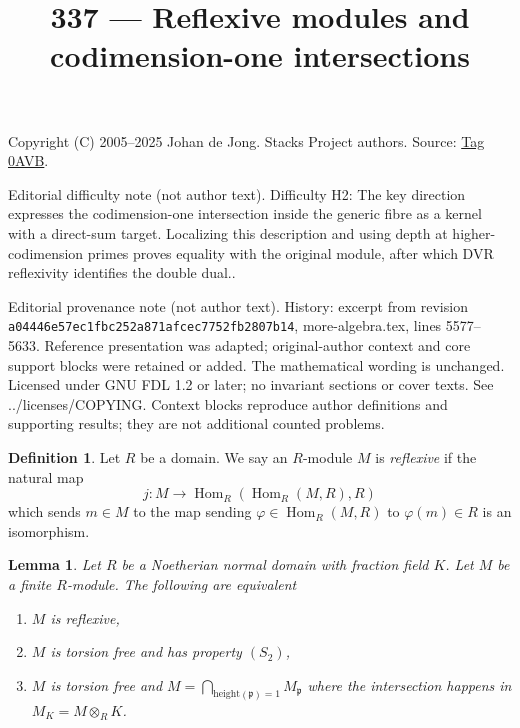 \documentclass{amsart}
\theoremstyle{plain}
\newtheorem{lemma}[subsection]{Lemma}
\theoremstyle{definition}
\newtheorem{definition}[subsection]{Definition}
\theoremstyle{remark}
\numberwithin{equation}{subsection}
\def\Hom{\mathop{\mathrm{Hom}}\nolimits}
\begin{document}
\title[Stacks Project, Tag 0AVB]{337 --- Reflexive modules and codimension-one intersections}
\maketitle
\noindent Copyright (C) 2005--2025 Johan de Jong. Stacks Project authors. Source: \href{https://stacks.math.columbia.edu/tag/0AVB}{Tag 0AVB}.

\noindent Editorial difficulty note (not author text). Difficulty H2: The key direction expresses the codimension-one intersection inside the generic fibre as a kernel with a direct-sum target. Localizing this description and using depth at higher-codimension primes proves equality with the original module, after which DVR reflexivity identifies the double dual..

\noindent Editorial provenance note (not author text). History: excerpt from revision \texttt{a0444\allowbreak 6e57e\allowbreak c1fbc\allowbreak 252a8\allowbreak 71afc\allowbreak ec775\allowbreak 2fb28\allowbreak 07b14}, more-algebra.tex, lines 5577--5633. Reference presentation was adapted; original-author context and core support blocks were retained or added. The mathematical wording is unchanged. Licensed under GNU FDL 1.2 or later; no invariant sections or cover texts. See ../licenses/COPYING. Context blocks reproduce author definitions and supporting results; they are not additional counted problems.

\begin{definition}
\label{definition-reflexive}
Let $R$ be a domain. We say an $R$-module $M$ is {\it reflexive} if
the natural map
$$
j : M \longrightarrow \Hom_R(\Hom_R(M, R), R)
$$
which sends $m \in M$ to the map sending $\varphi \in \Hom_R(M, R)$
to $\varphi(m) \in R$ is an isomorphism.
\end{definition}

\begin{lemma}
\label{lemma-reflexive-over-normal}
Let $R$ be a Noetherian normal domain with fraction field $K$.
Let $M$ be a finite $R$-module. The following are equivalent
\begin{enumerate}
\item $M$ is reflexive,
\item $M$ is torsion free and has property $(S_2)$,
\item $M$ is torsion free and
$M = \bigcap_{\text{height}(\mathfrak p) = 1} M_{\mathfrak p}$
where the intersection happens in $M_K = M \otimes_R K$.
\end{enumerate}
\end{lemma}
\end{document}
